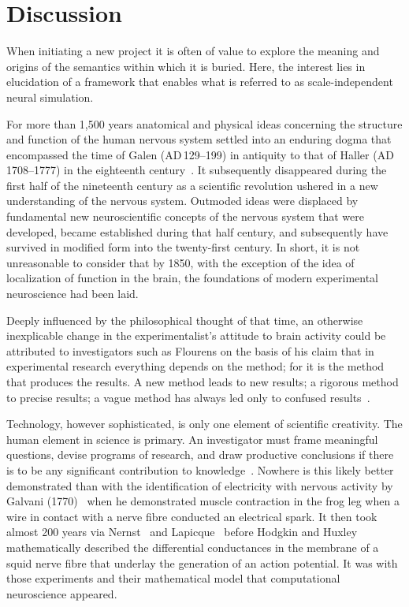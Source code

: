 \documentclass{article}
\begin{document}
\section{Discussion}

When initiating a new project it is often of value to explore the meaning and origins of the semantics within which it is buried. Here, the interest lies in elucidation of a framework that enables what is referred to as scale-independent neural simulation.

For more than 1,500 years anatomical and physical ideas concerning the structure and function of the human nervous system settled into an enduring dogma that encompassed the time of Galen (\small{AD}\,129--199) in antiquity to that of Haller (\small{AD}\,1708--1777) in the eighteenth century~\cite{clarke87}. It subsequently disappeared during the first half of the nineteenth century as a scientific revolution ushered in a new understanding of the nervous system. Outmoded ideas were displaced by fundamental new neuroscientific concepts of the nervous system that were developed, became established during that half century, and subsequently have survived in modified form into the twenty-first century. In short, it is not unreasonable to consider that by 1850, with the exception of the idea of localization of function in the brain, the foundations of modern experimental neuroscience had been laid.

Deeply influenced by the philosophical thought of that time, an otherwise inexplicable change in the experimentalist's attitude to brain activity could be attributed to investigators such as Flourens on the basis of his claim that in experimental research everything depends on the method; for it is the method that produces the results. A new method leads to new results; a rigorous method to precise results; a vague method has always led only to confused results~\cite{flourens24}.

Technology, however sophisticated, is only one element of scientific creativity. The human element in science is primary. An investigator must frame meaningful questions, devise programs of research, and draw productive conclusions if there is to be any significant contribution to knowledge~\cite{clarke87}. Nowhere is this likely better demonstrated than with the identification of electricity with nervous activity by Galvani (1770)~\cite{galvani91} when he demonstrated muscle contraction in the frog leg when a wire in contact with a nerve fibre conducted an electrical spark. It then took almost 200 years via Nernst~\cite{} and Lapicque~\cite{} before Hodgkin and Huxley~\cite{hodgkin52e} mathematically described the differential conductances in the membrane of a squid nerve fibre that underlay the generation of an action potential. It was with those experiments and their mathematical model that computational neuroscience appeared.
\end{document}
